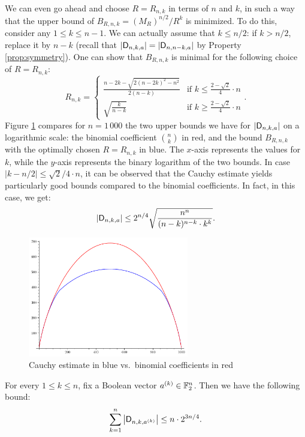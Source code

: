 \documentclass[11pt]{llncs}
\begin{document}
\begin{remark}
    We can even go ahead and choose $R=R_{n,k}$ in terms of $n$ and $k$, in such a way that the upper bound of $B_{R,n,k}=(M_R)^{n/2}/R^k$ is minimized. To do this, consider any $1\leq k\leq n-1$. We can actually assume that $k\leq n/2$: if $k>n/2$, replace it by $n-k$ (recall that $|\mathsf{D}_{n,k,a}|=|\mathsf{D}_{n,n-k,a}|$ by Property \ref{prop:symmetry}). One can show that $B_{R,n,k}$ is minimal for the following choice of $R=R_{n,k}$:
    \[
        R_{n,k}=\begin{cases}
            \frac{n-2k-\sqrt{2(n-2k)^2-n^2}}{2(n-k)}&\text{if $k\leq\frac{2-\sqrt 2}{4}\cdot n$}\\
            \sqrt{\frac{k}{n-k}}&\text{if $k\geq\frac{2-\sqrt 2}{4}\cdot n$}
        \end{cases}.
    \]
    Figure \ref{fig:cauchy_estimate} compares for $n=1\,000$ the two upper bounds we have for $|\mathsf{D}_{n,k,a}|$ on a logarithmic scale: the binomial coefficient $\binom nk$ in red, and the bound $B_{R,n,k}$ with the optimally chosen $R=R_{n,k}$ in blue. The $x$-axis represents the values for $k$, while the $y$-axis represents the binary logarithm of the two bounds. In case $|k-n/2|\leq\sqrt{2}/4\cdot n$, it can be observed that the Cauchy estimate yields particularly good bounds compared to the binomial coefficients. In fact, in this case, we get:
    \[
        |\mathsf{D}_{n,k,a}|\leq 2^{n/4}\sqrt{\frac{n^n}{(n-k)^{n-k}\cdot k^k}}.
    \]
    \begin{figure}
        \centering
        \includegraphics[width=7cm]{cauchy_estimate.pdf}
        \caption{Cauchy estimate in blue vs.\ binomial coefficients in red}
        \label{fig:cauchy_estimate}
    \end{figure}
\end{remark}
    
\begin{Prop}\label{prop:bound_sum_D_nka}
    For every $1\leq k\leq n$, fix a Boolean vector $a^{(k)}\in\mathbb{F}_2^n$. Then we have the following bound:
    \[
        \sum_{k=1}^n\left|\mathsf{D}_{n,k,a^{(k)}}\right|\leq n\cdot 2^{3n/4}.
    \]
\end{Prop}
\end{document}
